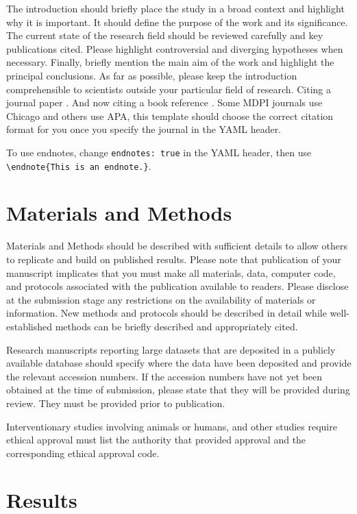 \documentclass[notspecified,article,submit,moreauthors,pdftex]{Definitions/mdpi}
\begin{document}
The introduction should briefly place the study in a broad context and
highlight why it is important. It should define the purpose of the work
and its significance. The current state of the research field should be
reviewed carefully and key publications cited. Please highlight
controversial and diverging hypotheses when necessary. Finally, briefly
mention the main aim of the work and highlight the principal
conclusions. As far as possible, please keep the introduction
comprehensible to scientists outside your particular field of research.
Citing a journal paper
\citep{bertrand-krajewski_distribution_1998, leutnant_stormwater_2016}.
And now citing a book reference \citet{gujer_systems_2008}. Some MDPI
journals use Chicago and others use APA, this template should choose the
correct citation format for you once you specify the journal in the YAML
header.

To use endnotes, change \texttt{endnotes:\ true} in the YAML header,
then use \texttt{\textbackslash{}endnote\{This\ is\ an\ endnote.\}}.

\section{Materials and Methods}\label{materials-and-methods}

Materials and Methods should be described with sufficient details to
allow others to replicate and build on published results. Please note
that publication of your manuscript implicates that you must make all
materials, data, computer code, and protocols associated with the
publication available to readers. Please disclose at the submission
stage any restrictions on the availability of materials or information.
New methods and protocols should be described in detail while
well-established methods can be briefly described and appropriately
cited.

Research manuscripts reporting large datasets that are deposited in a
publicly available database should specify where the data have been
deposited and provide the relevant accession numbers. If the accession
numbers have not yet been obtained at the time of submission, please
state that they will be provided during review. They must be provided
prior to publication.

Interventionary studies involving animals or humans, and other studies
require ethical approval must list the authority that provided approval
and the corresponding ethical approval code.

\section{Results}\label{results}
\end{document}
